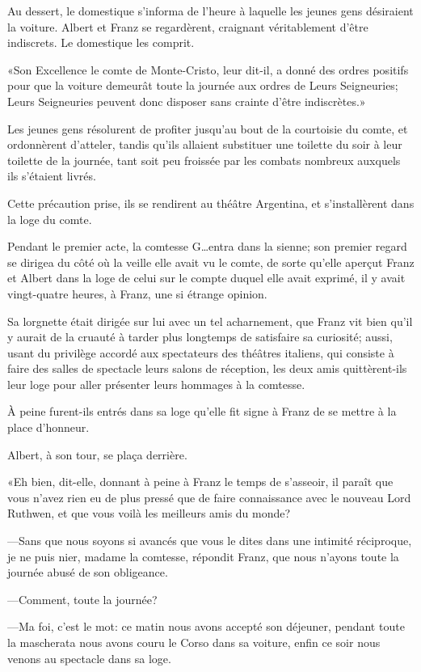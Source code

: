 Au dessert, le domestique s'informa de l'heure à laquelle les jeunes gens désiraient la voiture. Albert et Franz se regardèrent, craignant véritablement d'être indiscrets. Le domestique les comprit. 

«Son Excellence le comte de Monte-Cristo, leur dit-il, a donné des ordres positifs pour que la voiture demeurât toute la journée aux ordres de Leurs Seigneuries; Leurs Seigneuries peuvent donc disposer sans crainte d'être indiscrètes.» 

Les jeunes gens résolurent de profiter jusqu'au bout de la courtoisie du comte, et ordonnèrent d'atteler, tandis qu'ils allaient substituer une toilette du soir à leur toilette de la journée, tant soit peu froissée par les combats nombreux auxquels ils s'étaient livrés. 

Cette précaution prise, ils se rendirent au théâtre Argentina, et s'installèrent dans la loge du comte. 

Pendant le premier acte, la comtesse G\dots entra dans la sienne; son premier regard se dirigea du côté où la veille elle avait vu le comte, de sorte qu'elle aperçut Franz et Albert dans la loge de celui sur le compte duquel elle avait exprimé, il y avait vingt-quatre heures, à Franz, une si étrange opinion. 

Sa lorgnette était dirigée sur lui avec un tel acharnement, que Franz vit bien qu'il y aurait de la cruauté à tarder plus longtemps de satisfaire sa curiosité; aussi, usant du privilège accordé aux spectateurs des théâtres italiens, qui consiste à faire des salles de spectacle leurs salons de réception, les deux amis quittèrent-ils leur loge pour aller présenter leurs hommages à la comtesse. 

À peine furent-ils entrés dans sa loge qu'elle fit signe à Franz de se mettre à la place d'honneur. 

Albert, à son tour, se plaça derrière.  

«Eh bien, dit-elle, donnant à peine à Franz le temps de s'asseoir, il paraît que vous n'avez rien eu de plus pressé que de faire connaissance avec le nouveau Lord Ruthwen, et que vous voilà les meilleurs amis du monde? 

—Sans que nous soyons si avancés que vous le dites dans une intimité réciproque, je ne puis nier, madame la comtesse, répondit Franz, que nous n'ayons toute la journée abusé de son obligeance. 

—Comment, toute la journée? 

—Ma foi, c'est le mot: ce matin nous avons accepté son déjeuner, pendant toute la mascherata nous avons couru le Corso dans sa voiture, enfin ce soir nous venons au spectacle dans sa loge.  

